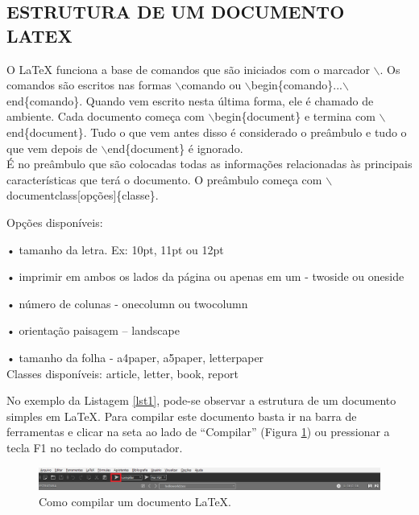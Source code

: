 \subsection{ESTRUTURA DE UM DOCUMENTO LATEX}
O LaTeX funciona a base de comandos que são iniciados com o marcador $\backslash$. Os comandos são escritos nas formas $\backslash$comando ou $\backslash$begin\{comando\}...$\backslash$end\{comando\}. Quando vem escrito nesta última forma, ele é chamado de ambiente. Cada documento começa com $\backslash$begin\{document\} e termina com $\backslash$end\{document\}. Tudo o que vem antes disso é considerado o preâmbulo e tudo o que vem depois de $\backslash$end\{document\} é ignorado.\\
É no preâmbulo que são colocadas todas as informações relacionadas às principais características que terá o documento. O preâmbulo começa com $\backslash$documentclass[opções]\{classe\}.

Opções disponíveis:

•	tamanho da letra. Ex: 10pt, 11pt ou 12pt

•	imprimir em ambos os lados da página ou apenas em um - twoside ou oneside

•	número de colunas - onecolumn ou twocolumn

•	orientação paisagem – landscape

•	tamanho da folha - a4paper, a5paper, letterpaper\\

Classes disponíveis: article, letter, book, report

\newpage


No exemplo da Listagem \ref{lst1}, pode-se observar a estrutura de um documento simples em LaTeX. Para compilar este documento basta ir na barra de ferramentas e clicar na seta ao lado de “Compilar” (Figura \ref{comp}) ou pressionar a tecla F1 no teclado do computador.

\begin{figure}[h!]
  \begin{center}
    \includegraphics[scale=0.45]{imagens/compilar.png}
  \end{center}
  \caption{Como compilar um documento LaTeX.}
  \label{comp}
\end{figure}

